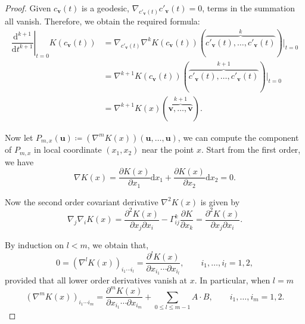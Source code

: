 \documentclass[reqno,11pt]{article}
\theoremstyle{definition}
\theoremstyle{remark}
\numberwithin{equation}{section}
\begin{document}
\begin{proof}
	Given $c_{\bm{v}}(t)$ is a geodesic, $\nabla_{c'_{\bm{v}}(t)}c'_{\bm{v}}(t)=0$, terms in the summation all vanish. Therefore, we obtain the required formula:
	\begin{displaymath}
		\begin{aligned}
			\left.\dfrac{\mathrm{d}^{k+1}}{\mathrm{d}t^{k+1}}\right\rvert_{t=0}K(c_{\bm{v}}(t)) & =\nabla_{c'_{\bm{v}}(t)}\nabla^{k}K(c_{\bm{v}}(t))(\overbrace{c'_{\bm{v}}(t),\ldots,c'_{\bm{v}}(t)}^{k})\rvert_{t=0} \\
			                                                                                    & =\nabla^{k+1}K(c_{\bm{v}}(t))(\overbrace{c'_{\bm{v}}(t),\ldots,c'_{\bm{v}}(t)}^{k+1})\rvert_{t=0}                    \\
			                                                                                    & =\nabla^{k+1} K(x)(\overbrace{\bm{v},\ldots,\bm{v}}^{k+1}).
		\end{aligned}
	\end{displaymath}

	Now let $P_{m,x}(\bm{u})\coloneq(\nabla^{m}K(x))(\bm{u},\ldots,\bm{u})$, we can compute the component of $P_{m,x}$ in local coordinate $(x_1,x_2)$ near the point $x$. Start from the first order, we have
	\begin{displaymath}
		\nabla K(x)=\dfrac{\partial K(x)}{\partial x_{1}}\mathrm{d}x_{1} + \dfrac{\partial K(x)}{\partial x_{2}}\mathrm{d}x_2=0.
	\end{displaymath}

	Now the second order covariant derivative $\nabla^{2}K(x)$ is given by
	\begin{displaymath}
		\nabla_{j}\nabla_{i}K(x)=\dfrac{\partial^2 K(x)}{\partial x_{j}\partial x_{i}}-\Gamma^{k}_{ij}\dfrac{\partial K}{\partial x_{k}}=\dfrac{\partial^2 K(x)}{\partial x_{j}\partial x_{i}}.
	\end{displaymath}

	By induction on $l<m$, we obtain that,
	\begin{displaymath}
		0={(\nabla^{l} K(x))}_{i_{1}\cdots i_{l}}=\dfrac{\partial^{l} K(x)}{\partial x_{i_1}\cdots\partial x_{i_l}},\qquad i_1,\ldots,i_l=1,2,
	\end{displaymath}
	provided that all lower order derivatives vanish at $x$. In particular, when $l=m$
	\begin{displaymath}
		{\left(\nabla^{m} K(x)\right)}_{i_{1} \cdots i_{m}}=\dfrac{\partial^{m} K(x)}{\partial x_{i_{1}}\cdots\partial x_{i_{m}}}+\sum_{0\leq l\leq m-1} A\cdot B,\qquad i_1,\ldots,i_m=1,2.
	\end{displaymath}


\end{proof}
\end{document}
